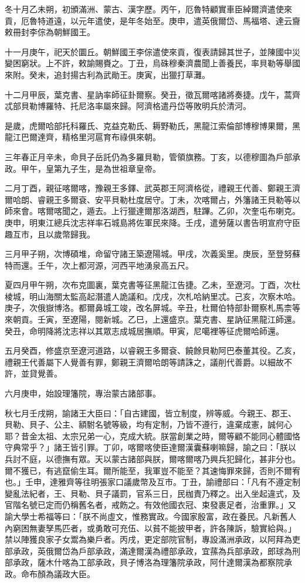 \begin{pinyinscope}
冬十月乙未朔，初頒滿洲、蒙古、漢字歷。丙午，厄魯特顧實車臣綽爾濟遣使來貢，厄魯特道遠，以元年遣使，是年冬始至。庚申，遣英俄爾岱、馬福塔、達云齎敕冊封李倧為朝鮮國王。

十一月庚午，祀天於圜丘。朝鮮國王李倧遣使來貢，復表請歸其世子，並陳國中災變困窮狀。上不許，敕諭賜賚之。丁丑，烏硃穆秦濟農聞上善養民，率貝勒等舉國來附。癸未，追封揚古利為武勛王。庚寅，出獵打草灘。

十二月甲辰，葉克書、星訥率師征卦爾察。癸丑，徵瓦爾喀諸將奏捷。戊午，蒿齊忒部貝勒博羅特、托尼洛率屬來歸。阿濟格遣丹岱等敗明兵於清河。

是歲，虎爾哈部托科羅氏、克益克勒氏、耨野勒氏，黑龍江索倫部博穆博果爾，黑龍江巴爾達齊，精格里河扈育布祿俱來朝。

三年春正月辛未，命貝子岳託仍為多羅貝勒，管領旗務。丁亥，以德穆圖為戶部承政。甲午，皇第九子生，是為世祖章皇帝。

二月丁酉，親征喀爾喀，豫親王多鐸、武英郡王阿濟格從，禮親王代善、鄭親王濟爾哈朗、睿親王多爾袞、安平貝勒杜度居守。丁未，次喀爾占，外籓諸王貝勒等以師來會。喀爾喀聞之，遁去。上行獵達爾那洛湖西，駐蹕。乙卯，次奎屯布喇克。庚申，明東江總兵沈志祥率石城島將佐軍民來降。壬戌，遣勞薩以書告明宣府守臣趣互市，且以歲幣歸我。

三月甲子朔，次博碩堆，命留守諸王築遼陽城。甲戌，次義奚里。庚辰，至登努蘇特而還。壬午，次上都河源，河西平地湧泉高五尺。

夏四月甲午朔，次布克圖裏，葉克書等征黑龍江告捷。乙未，至遼河。丁酉，次杜棱城，明山海關太監高起潛遣人詭議和。戊戌，次札哈納里忒。己亥，次察木哈。庚子，次俄嶽博洛。都爾鼻城工竣，改名屏城。辛丑，杜爾伯特部卦爾察札馬柰等來朝貢。壬寅，至遼陽，閱新城。乙巳，上還盛京。葉克書、星訥征黑龍江師還。癸丑，命明降將沈志祥以其眾志成城居撫順。甲寅，尼噶裡等征虎爾哈師還。

五月癸酉，修盛京至遼河道路，以睿親王多爾袞、饒餘貝勒阿巴泰董其役。乙亥，禮親王代善屬下人覺善有罪，鄭親王濟爾哈朗等請誅之，議削代善爵。以細故不許，並貸覺善。

六月庚申，始設理籓院，專治蒙古諸部事。

秋七月壬戌朔，諭諸王大臣曰：「自古建國，皆立制度，辨等威。今親王、郡王、貝勒、貝子、公主、額駙名號等級，均有定制，乃皆不遵行，違棄成憲，誠何心耶？昔金太祖、太宗兄弟一心，克成大統。朕當創業之時，爾等顧不能同心體國恪守典常乎？」諸王皆引罪。丁卯，喀爾喀使臣達爾漢囊蘇喇嘛歸，諭之曰：「朕以兵討不庭，以德撫有眾。天以蒙古諸部與朕，爾喀爾喀乃興兵犯歸化，甚非分也。爾不獲已，有逃竄偷生耳。爾所能至，我軍豈不能至？其速悔罪來歸，否則不爾宥也。」壬申，達雅齊等往明張家口議歲幣及互市。丁丑，諭禮部曰：「凡有不遵定制變亂法紀者，王、貝勒、貝子議罰，官系三日，民枷責乃釋之。出入坐起違式，及官階名號已定而仍稱舊名者，戒飭之。有效他國衣冠、束發裹足者，治重罪。」又諭大學士希福等曰：「朕不尚虛文，惟務實政。今國家殷富，政在養民。凡新舊人內窮困無妻孥馬匹者，或勇敢可充伍、以貧不能披甲者，許各陳訴，驗實給與。」禁以陣獲良家子女鬻為樂戶者。丙戌，更定部院官制，專設滿洲承政，以阿拜為吏部承政，英俄爾岱為戶部承政，滿達爾漢為禮部承政，宜蓀為兵部承政，郎球為刑部承政，薩木什喀為工部承政，貝子博洛為理籓院承政，阿什達爾漢為都察院承政。命布顏為議政大臣。


\end{pinyinscope}
